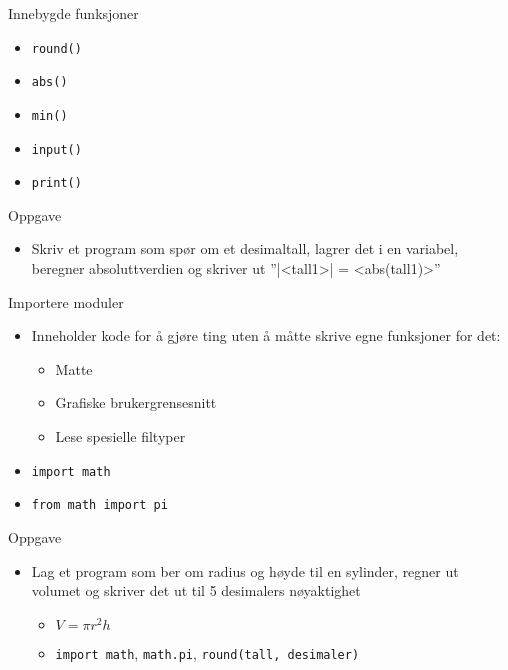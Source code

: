 \documentclass[screen, aspectratio=169]{beamer}
\begin{document}
\begin{frame}[fragile]{Innebygde funksjoner}
	\begin{itemize}
		\item \lstinline|round()|
		\item \lstinline|abs()|
		\item \lstinline|min()|
		\item \lstinline|input()|
		\item \lstinline|print()|
	\end{itemize}
\end{frame}

\begin{frame}{Oppgave}
	\begin{itemize}
		\item Skriv et program som spør om et desimaltall, lagrer det i en variabel, beregner absoluttverdien og skriver ut ''|<tall1>| = <abs(tall1)>''
	\end{itemize}
\end{frame}

\begin{frame}{Importere moduler}
	\begin{itemize}
		\item Inneholder kode for å gjøre ting uten å måtte skrive egne funksjoner for det:
		\begin{itemize}
			\item Matte
			\item Grafiske brukergrensesnitt
			\item Lese spesielle filtyper
		\end{itemize}
		\item \lstinline|import math|
		\item \lstinline|from math import pi|
	\end{itemize}
\end{frame}

\begin{frame}[fragile]{Oppgave}
	\begin{itemize}
		\item Lag et program som ber om radius og høyde til en sylinder, regner ut volumet og skriver det ut til 5 desimalers nøyaktighet
		\begin{itemize}
			\item $V=\pi r^2 h$
			\item \lstinline|import math|, \lstinline|math.pi|, \lstinline|round(tall, desimaler)|
		\end{itemize}
	\end{itemize}
\end{frame}
\end{document}
